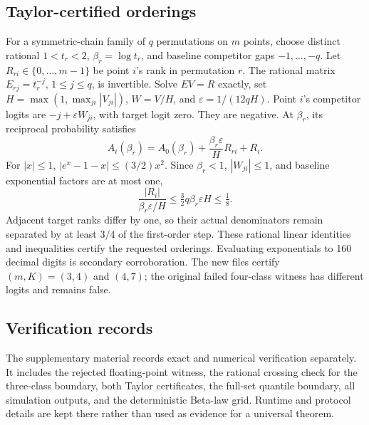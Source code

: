 \documentclass[10pt]{article}
\theoremstyle{definition}\newtheorem{definition}[theorem]{Definition}
\theoremstyle{remark}\newtheorem{remark}[theorem]{Remark}
\newcommand{\1}{\mathbf 1}
\begin{document}
\subsection{Taylor-certified orderings}
For a symmetric-chain family of $q$ permutations on $m$ points, choose distinct rational $1<t_r<2$, $\beta_r=\log t_r$, and baseline competitor gaps $-1,\ldots,-q$. Let $R_{ri}\in\{0,\ldots,m-1\}$ be point $i$'s rank in permutation $r$. The rational matrix $E_{rj}=t_r^{-j}$, $1\le j\le q$, is invertible. Solve $EV=R$ exactly, set $H=\max(1,\max_{ji}|V_{ji}|)$, $W=V/H$, and $\varepsilon=1/(12qH)$. Point $i$'s competitor logits are $-j+\varepsilon W_{ji}$, with target logit zero. They are negative. At $\beta_r$, its reciprocal probability satisfies
\[
 A_i(\beta_r)=A_0(\beta_r)+\frac{\beta_r\varepsilon}{H}R_{ri}+R_i.
\]
For $|x|\le1$, $|e^x-1-x|\le(3/2)x^2$. Since $\beta_r<1$, $|W_{ji}|\le1$, and baseline exponential factors are at most one,
\[
 \frac{|R_i|}{\beta_r\varepsilon/H}
 \le\tfrac32q\beta_r\varepsilon H\le\tfrac18.
\]
Adjacent target ranks differ by one, so their actual denominators remain separated by at least $3/4$ of the first-order step. These rational linear identities and inequalities certify the requested orderings. Evaluating exponentials to 160 decimal digits is secondary corroboration. The new files certify $(m,K)=(3,4)$ and $(4,7)$; the original failed four-class witness has different logits and remains false.

\subsection{Verification records}
The supplementary material records exact and numerical verification separately. It includes the rejected floating-point witness, the rational crossing check for the three-class boundary, both Taylor certificates, the full-set quantile boundary, all simulation outputs, and the deterministic Beta-law grid. Runtime and protocol details are kept there rather than used as evidence for a universal theorem.
\end{document}
